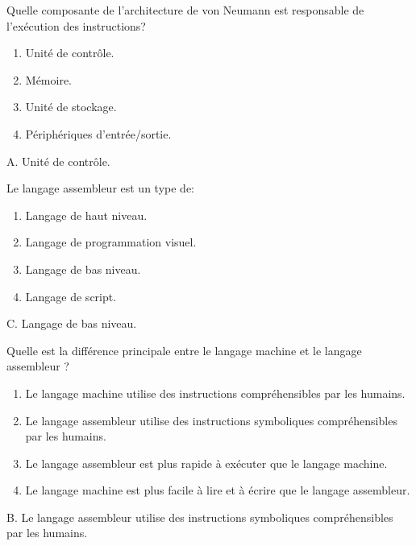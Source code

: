 \documentclass[11pt,a4paper]{exam}
\newenvironment{QCM}
{\begin{enumerate}[label=\Alph*.]}
	{\end{enumerate}}
\begin{document}
\begin{questions}
\begin{spacing}{1}
\begin{parts}
\begin{subparts}
				\subpart Quelle composante de l'architecture de von Neumann est responsable de l'exécution des instructions?
				\begin{QCM}
					\item Unité de contrôle.
					\item Mémoire.
					\item Unité de stockage.
					\item  Périphériques d'entrée/sortie.
				\end{QCM}
				\begin{solution}
					A. Unité de contrôle.
				\end{solution}
				
				\subpart Le langage assembleur est un type de:
				\begin{QCM}
					\item Langage de haut niveau.
					\item Langage de programmation visuel.
					\item Langage de bas niveau.
					\item  Langage de script.
				\end{QCM}
				\begin{solution}
					C. Langage de bas niveau.
				\end{solution}
				
				\subpart Quelle est la différence principale entre le langage machine et le langage assembleur ?
				\begin{QCM}
					\item Le langage machine utilise des instructions compréhensibles par les humains.
					\item Le langage assembleur utilise des instructions symboliques compréhensibles par les humains.
					\item Le langage assembleur est plus rapide à exécuter que le langage machine.
					\item  Le langage machine est plus facile à lire et à écrire que le langage assembleur.
				\end{QCM}
				\begin{solution}
					B. Le langage assembleur utilise des instructions symboliques compréhensibles par les humains.
				\end{solution}
				\end{subparts}
			

\end{parts}
\end{spacing}
\end{questions}
\end{document}
